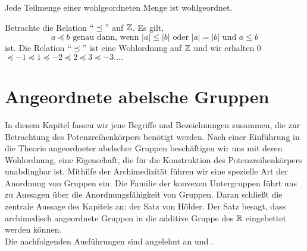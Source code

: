 %

%
%
\begin{bem}\label{Teilmengewohlgeordnet}
Jede Teilmenge einer wohlgeordneten Menge ist wohlgeordnet.
\end{bem}
\begin{bsp}
Betrachte die Relation $``\preceq " $ auf $\mathbb{Z}$. Es gilt,  
\[a \preceq b \text{ genau dann, wenn } |a| \le |b| \text{ oder }  |a| = |b| \text{ und } a \leq  b\]
ist.
Die Relation $``\preceq "$ ist eine Wohlordnung auf $\mathbb{Z}$ und wir erhalten 0$  \preceq -1 \preceq 1 \preceq -2 \preceq 2 \preceq 3 \preceq -3 .... $ 
\end{bsp}
%

%
 
\chapter{Angeordnete abelsche Gruppen}\label{chap2} %
In diesem Kapitel fassen wir jene Begriffe und Bezeichnungen zusammen, die zur Betrachtung des Potenzreihenkörpers benötigt werden. Nach einer Einführung in die Theorie angeordneter abelscher Gruppen beschäftigen wir uns mit deren Wohlordnung, eine Eigenschaft, die für die Konstruktion des Potenzreihenkörpers unabdingbar ist. Mithilfe der Archimedizität führen wir eine spezielle Art der Anordnung von Gruppen ein. Die Familie der konvexen Untergruppen führt uns zu Aussagen über die Anordnungsfähigkeit von Gruppen. Daran schließt die zentrale Aussage des Kapitels an: der Satz von Hölder. Der Satz besagt, dass archimedisch angeordnete Gruppen in die additive Gruppe des $\mathbb{R}$ eingebettet werden können. \\
Die nachfolgenden Ausführungen sind angelehnt an \cite[S. 21 - 28]{fuchs66} und \cite[S. 1 -  4]{priesscrampe83}.
%
%

